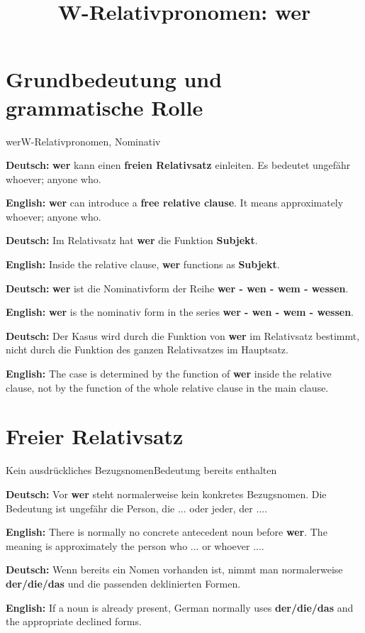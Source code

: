 \documentclass[a4paper,11pt]{article}
\title{W-Relativpronomen: \glqq wer\grqq{}}
\date{}
\newcommand{\GermanText}[1]{\textbf{Deutsch: }#1\par}
\newcommand{\EnglishText}[1]{{\small\color{SoftGray}\textbf{English: }#1\par}}
\begin{document}
\maketitle

\tableofcontents

\newpage

\section{Grundbedeutung und grammatische Rolle}

\begin{grammarentry}{wer}{W-Relativpronomen, Nominativ}

\GermanText{\textbf{wer} kann einen \textbf{freien Relativsatz} einleiten. Es bedeutet ungefähr \glqq whoever; anyone who\grqq{}.}

\EnglishText{\textbf{wer} can introduce a \textbf{free relative clause}. It means approximately \glqq whoever; anyone who\grqq{}.}

\GermanText{Im Relativsatz hat \textbf{wer} die Funktion \textbf{Subjekt}.}

\EnglishText{Inside the relative clause, \textbf{wer} functions as \textbf{Subjekt}.}

\GermanText{\textbf{wer} ist die Nominativform der Reihe \textbf{wer - wen - wem - wessen}.}

\EnglishText{\textbf{wer} is the nominativ form in the series \textbf{wer - wen - wem - wessen}.}

\GermanText{Der Kasus wird durch die Funktion von \textbf{wer} im Relativsatz bestimmt, nicht durch die Funktion des ganzen Relativsatzes im Hauptsatz.}

\EnglishText{The case is determined by the function of \textbf{wer} inside the relative clause, not by the function of the whole relative clause in the main clause.}

\end{grammarentry}

\section{Freier Relativsatz}

\begin{grammarentry}{Kein ausdrückliches Bezugsnomen}{Bedeutung bereits enthalten}

\GermanText{Vor \textbf{wer} steht normalerweise kein konkretes Bezugsnomen. Die Bedeutung ist ungefähr \glqq die Person, die ...\grqq{} oder \glqq jeder, der ...\grqq{}.}

\EnglishText{There is normally no concrete antecedent noun before \textbf{wer}. The meaning is approximately \glqq the person who ...\grqq{} or \glqq whoever ...\grqq{}.}

\GermanText{Wenn bereits ein Nomen vorhanden ist, nimmt man normalerweise \textbf{der/die/das} und die passenden deklinierten Formen.}

\EnglishText{If a noun is already present, German normally uses \textbf{der/die/das} and the appropriate declined forms.}

\end{grammarentry}
\end{document}
